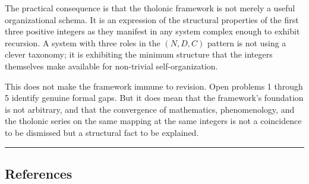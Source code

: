 \documentclass[
  11pt,
  letterpaper,
]{article}
\begin{document}
The practical consequence is that the tholonic framework is not merely a
useful organizational schema. It is an expression of the structural
properties of the first three positive integers as they manifest in any
system complex enough to exhibit recursion. A system with three roles in
the \((N, D, C)\) pattern is not using a clever taxonomy; it is
exhibiting the minimum structure that the integers themselves make
available for non-trivial self-organization.

This does not make the framework immune to revision. Open problems 1
through 5 identify genuine formal gaps. But it does mean that the
framework's foundation is not arbitrary, and that the convergence of
mathematics, phenomenology, and the tholonic series on the same mapping
at the same integers is not a coincidence to be dismissed but a
structural fact to be explained.

\begin{center}\rule{0.5\linewidth}{0.5pt}\end{center}

\subsection{References}\label{references}
\end{document}
